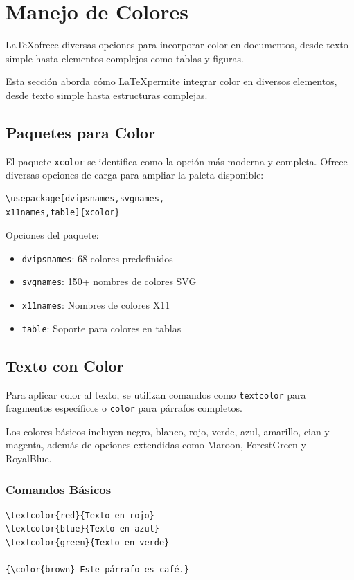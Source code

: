 \section{Manejo de Colores}

\LaTeX ofrece diversas opciones para incorporar color en documentos, desde texto simple hasta elementos complejos como tablas y figuras.

Esta sección aborda cómo \LaTeX permite integrar color en diversos elementos, desde texto simple hasta estructuras complejas.

\subsection{Paquetes para Color}
El paquete \texttt{xcolor} se identifica como la opción más moderna y completa. Ofrece diversas opciones de carga para ampliar la paleta disponible:

\begin{verbatim}
\usepackage[dvipsnames,svgnames,
x11names,table]{xcolor}
\end{verbatim}

Opciones del paquete:
\begin{itemize}
    \item \texttt{dvipsnames}: 68 colores predefinidos
    \item \texttt{svgnames}: 150+ nombres de colores SVG
    \item \texttt{x11names}: Nombres de colores X11
    \item \texttt{table}: Soporte para colores en tablas
\end{itemize}

\subsection{Texto con Color}
Para aplicar color al texto, se utilizan comandos como \texttt{textcolor} para fragmentos específicos o \texttt{color} para párrafos completos.

Los colores básicos incluyen negro, blanco, rojo, verde, azul, amarillo, cian y magenta, además de opciones extendidas como Maroon, ForestGreen y RoyalBlue.

\subsubsection{Comandos Básicos}
\begin{verbatim}
\textcolor{red}{Texto en rojo}
\textcolor{blue}{Texto en azul}
\textcolor{green}{Texto en verde}

{\color{brown} Este párrafo es café.}
\end{verbatim}

